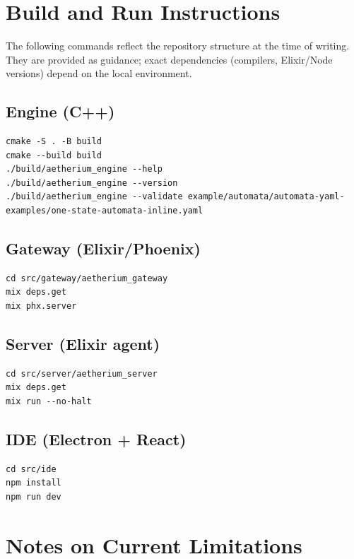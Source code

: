 \chapter{Build and Run Instructions}
\label{app:run}

The following commands reflect the repository structure at the time of writing.
They are provided as guidance; exact dependencies (compilers, Elixir/Node versions) depend on the local environment.

\section{Engine (C++)}

\begin{verbatim}
cmake -S . -B build
cmake --build build
./build/aetherium_engine --help
./build/aetherium_engine --version
./build/aetherium_engine --validate example/automata/automata-yaml-examples/one-state-automata-inline.yaml
\end{verbatim}

\section{Gateway (Elixir/Phoenix)}

\begin{verbatim}
cd src/gateway/aetherium_gateway
mix deps.get
mix phx.server
\end{verbatim}

\section{Server (Elixir agent)}

\begin{verbatim}
cd src/server/aetherium_server
mix deps.get
mix run --no-halt
\end{verbatim}

\section{IDE (Electron + React)}

\begin{verbatim}
cd src/ide
npm install
npm run dev
\end{verbatim}

\chapter{Notes on Current Limitations}
\label{app:limits}

